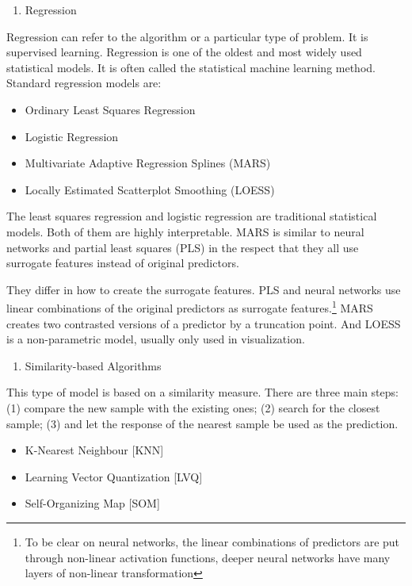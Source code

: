 \documentclass[]{book}
\providecommand{\tightlist}{%
  \setlength{\itemsep}{0pt}\setlength{\parskip}{0pt}}
\let\rmarkdownfootnote\footnote%
\def\footnote{\protect\rmarkdownfootnote}
\theoremstyle{definition}
\theoremstyle{definition}
\theoremstyle{remark}
\begin{document}
\begin{enumerate}
\def\labelenumi{\arabic{enumi}.}
\tightlist
\item
  Regression
\end{enumerate}

Regression can refer to the algorithm or a particular type of problem.
It is supervised learning. Regression is one of the oldest and most
widely used statistical models. It is often called the statistical
machine learning method. Standard regression models are:

\begin{itemize}
\tightlist
\item
  Ordinary Least Squares Regression
\item
  Logistic Regression
\item
  Multivariate Adaptive Regression Splines (MARS)
\item
  Locally Estimated Scatterplot Smoothing (LOESS)
\end{itemize}

The least squares regression and logistic regression are traditional
statistical models. Both of them are highly interpretable. MARS is
similar to neural networks and partial least squares (PLS) in the
respect that they all use surrogate features instead of original
predictors.

They differ in how to create the surrogate features. PLS and neural
networks use linear combinations of the original predictors as surrogate
features.\footnote{To be clear on neural networks, the linear
  combinations of predictors are put through non-linear activation
  functions, deeper neural networks have many layers of non-linear
  transformation} MARS creates two contrasted versions of a predictor by
a truncation point. And LOESS is a non-parametric model, usually only
used in visualization.

\begin{enumerate}
\def\labelenumi{\arabic{enumi}.}
\setcounter{enumi}{1}
\tightlist
\item
  Similarity-based Algorithms
\end{enumerate}

This type of model is based on a similarity measure. There are three
main steps: (1) compare the new sample with the existing ones; (2)
search for the closest sample; (3) and let the response of the nearest
sample be used as the prediction.

\begin{itemize}
\tightlist
\item
  K-Nearest Neighbour {[}KNN{]}
\item
  Learning Vector Quantization {[}LVQ{]}
\item
  Self-Organizing Map {[}SOM{]}
\end{itemize}
\end{document}
